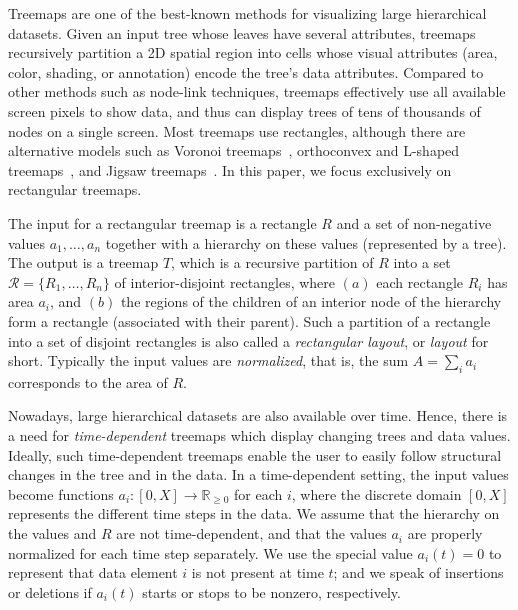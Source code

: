 Treemaps are one of the best-known methods for visualizing large hierarchical datasets. Given an input tree whose leaves have several attributes, treemaps recursively partition a 2D spatial region into cells whose visual attributes (area, color, shading, or annotation) encode the tree's data attributes. Compared to other methods such as node-link techniques, treemaps effectively use all available screen pixels to show data, and thus can display trees of tens of thousands of nodes on a single screen. Most treemaps use rectangles, although there are alternative models such as Voronoi treemaps~\citep{balzer05b}, orthoconvex and L-shaped treemaps~\citep{deberg14}, and Jigsaw treemaps~\citep{jigsaw}. 
In this paper, we focus exclusively on rectangular treemaps.

The input for a rectangular treemap is a rectangle $R$ and a set of non-negative values $a_1, \ldots, a_n$ together with a hierarchy on these values (represented by a tree). The output is a treemap $T$, which is a recursive partition of $R$ into a set $\mathcal{R}=\{R_1, \ldots, R_n \}$ of interior-disjoint rectangles, where $(a)$ each rectangle $R_i$ has area $a_i$, and $(b)$ the regions of the children of an interior node of the hierarchy form a rectangle (associated with their parent). Such a partition of a rectangle into a set of disjoint rectangles is also called a \emph{rectangular layout}, or \emph{layout} for short. Typically the input values are \emph{normalized}, that is, the sum $A = \sum_i a_i$ corresponds to the area of $R$.

Nowadays, large hierarchical datasets are also available over time. Hence, there is a need for \emph{time-dependent} treemaps which display changing trees and data values. Ideally, such time-dependent treemaps enable the user to easily follow structural changes in the tree and in the data. In a time-dependent setting, the input values become functions $a_i\colon [0, X] \rightarrow \mathbb{R}_{\geq 0}$ for each $i$, where the discrete domain $[0, X]$ represents the different time steps in the data. We assume that the hierarchy on the values and $R$ are not time-dependent, and that the values $a_i$ are properly normalized for each time step separately. We use the special value $a_i(t) = 0$ to represent that data element $i$ is not present at time $t$; and we speak of insertions or deletions if $a_i(t)$ starts or stops to be nonzero, respectively.

